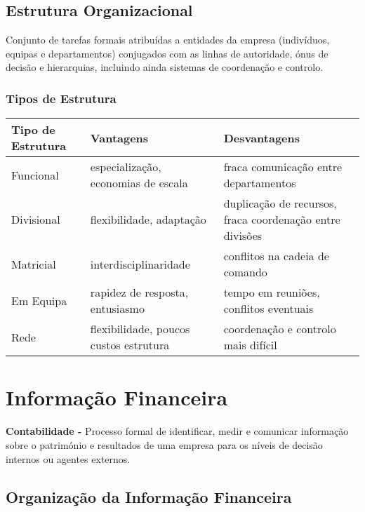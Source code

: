 \documentclass[11pt]{article}
\begin{document}
\subsection{Estrutura Organizacional}

Conjunto de tarefas formais atribuídas a entidades da empresa (indivíduos, equipas e departamentos) conjugados com as linhas de autoridade, ónus de decisão e hierarquias, incluindo ainda sistemas de coordenação e controlo.

\subsubsection{Tipos de Estrutura}

\begin{tabular}{ | C{90pt} | C{100pt} | C{150pt} | }
    \hline
    Tipo de Estrutura & Vantagens                              & Desvantagens                                             \\\hline
    Funcional         & especialização, economias de escala    & fraca comunicação entre departamentos                    \\\hline
    Divisional        & flexibilidade, adaptação               & duplicação de recursos, fraca coordenação entre divisões \\\hline
    Matricial         & interdisciplinaridade                  & conflitos na cadeia de comando                           \\\hline
    Em Equipa         & rapidez de resposta, entusiasmo        & tempo em reuniões, conflitos eventuais                   \\\hline
    Rede              & flexibilidade, poucos custos estrutura & coordenação e controlo mais difícil                      \\\hline
\end{tabular}

\newpage

\section{Informação Financeira}

\textbf{Contabilidade -} Processo formal de identificar, medir e comunicar informação sobre o património e resultados de uma empresa para os níveis de decisão internos ou agentes externos.

\subsection{Organização da Informação Financeira}
\end{document}
